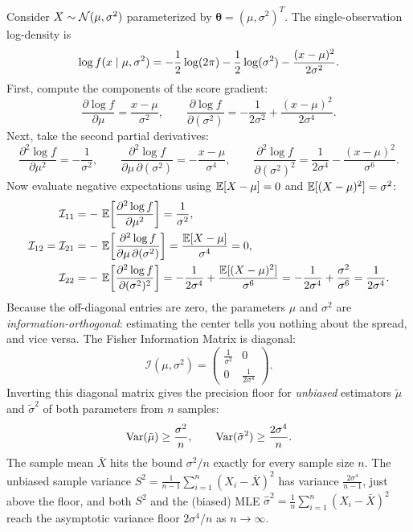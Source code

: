 \begin{example}
\label{ch30:ex-fim-normal}
Consider $X \sim \mathcal{N}(\mu, \sigma^2)$ parameterized by $\bm\theta = (\mu, \sigma^2)^T$. The single-observation log-density is
\[
  \log f(x\mid \mu, \sigma^2) = -\frac{1}{2}\log(2\pi) - \frac{1}{2}\log(\sigma^2) - \frac{(x-\mu)^2}{2\sigma^2}.
\]
First, compute the components of the score gradient:
\[
  \frac{\partial \log f}{\partial \mu} = \frac{x-\mu}{\sigma^2},
  \qquad
  \frac{\partial \log f}{\partial (\sigma^2)} = -\frac{1}{2\sigma^2} + \frac{(x-\mu)^2}{2\sigma^4}.
\]
Next, take the second partial derivatives:
\[
  \frac{\partial^2 \log f}{\partial \mu^2} = -\frac{1}{\sigma^2},
  \qquad
  \frac{\partial^2 \log f}{\partial \mu\,\partial(\sigma^2)} = -\frac{x-\mu}{\sigma^4},
  \qquad
  \frac{\partial^2 \log f}{\partial (\sigma^2)^2} = \frac{1}{2\sigma^4} - \frac{(x-\mu)^2}{\sigma^6}.
\]
Now evaluate negative expectations using $\operatorname{\mathbb{E}}[X-\mu]=0$ and $\operatorname{\mathbb{E}}[(X-\mu)^2]=\sigma^2$:
\begin{align*}
  \mathcal{I}_{11} &= -\,\operatorname{\mathbb{E}}\!\left[\frac{\partial^2 \log f}{\partial \mu^2}\right] = \frac{1}{\sigma^2}, \\
  \mathcal{I}_{12} = \mathcal{I}_{21} &= -\,\operatorname{\mathbb{E}}\!\left[\frac{\partial^2 \log f}{\partial \mu\,\partial(\sigma^2)}\right] = \frac{\operatorname{\mathbb{E}}[X-\mu]}{\sigma^4} = 0, \\
  \mathcal{I}_{22} &= -\,\operatorname{\mathbb{E}}\!\left[\frac{\partial^2 \log f}{\partial (\sigma^2)^2}\right] = -\frac{1}{2\sigma^4} + \frac{\operatorname{\mathbb{E}}[(X-\mu)^2]}{\sigma^6} = -\frac{1}{2\sigma^4} + \frac{\sigma^2}{\sigma^6} = \frac{1}{2\sigma^4}.
\end{align*}
Because the off-diagonal entries are zero, the parameters $\mu$ and $\sigma^2$ are \emph{information-orthogonal}: estimating the center tells you nothing about the spread, and vice versa. The Fisher Information Matrix is diagonal:
\[
  \mathcal{I}(\mu, \sigma^2) = \begin{pmatrix} \frac{1}{\sigma^2} & 0 \\ 0 & \frac{1}{2\sigma^4} \end{pmatrix}.
\]
Inverting this diagonal matrix gives the precision floor for \emph{unbiased} estimators $\tilde\mu$ and $\tilde\sigma^2$ of both parameters from $n$ samples:
\[
  \operatorname{Var}(\tilde\mu) \ge \frac{\sigma^2}{n}, \qquad \operatorname{Var}(\tilde\sigma^2) \ge \frac{2\sigma^4}{n}.
\]
The sample mean $\bar X$ hits the bound $\sigma^2/n$ exactly for every sample size $n$. The unbiased sample variance $S^2 = \frac{1}{n-1}\sum_{i=1}^n (X_i-\bar X)^2$ has variance $\frac{2\sigma^4}{n-1}$, just above the floor, and both $S^2$ and the (biased) MLE $\hat\sigma^2 = \frac{1}{n}\sum_{i=1}^n (X_i-\bar X)^2$ reach the asymptotic variance floor $2\sigma^4/n$ as $n\to\infty$.
\end{example}

